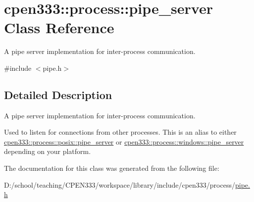 \hypertarget{classcpen333_1_1process_1_1pipe__server}{}\section{cpen333\+:\+:process\+:\+:pipe\+\_\+server Class Reference}
\label{classcpen333_1_1process_1_1pipe__server}


A pipe server implementation for inter-\/process communication.  




{\ttfamily \#include $<$pipe.\+h$>$}



\subsection{Detailed Description}
A pipe server implementation for inter-\/process communication. 

Used to listen for connections from other processes. This is an alias to either \hyperlink{classcpen333_1_1process_1_1posix_1_1pipe__server}{cpen333\+::process\+::posix\+::pipe\+\_\+server} or \hyperlink{classcpen333_1_1process_1_1windows_1_1pipe__server}{cpen333\+::process\+::windows\+::pipe\+\_\+server} depending on your platform. 

The documentation for this class was generated from the following file\+:\begin{DoxyCompactItemize}
\item 
D\+:/school/teaching/\+C\+P\+E\+N333/workspace/library/include/cpen333/process/\hyperlink{pipe_8h}{pipe.\+h}\end{DoxyCompactItemize}
